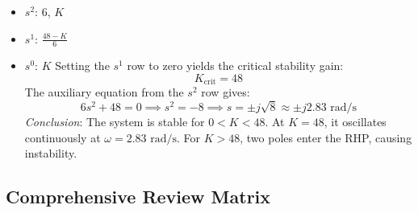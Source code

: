 \documentclass[12pt,onecolumn,twoside ]{article}
\begin{document}
\begin{enumerate}
\begin{itemize}
			$s^3$: $1$, $8$
			\item
			$s^2$: $6$, $K$
			\item
			$s^1$: $\frac{48 - K}{6}$
			\item
			$s^0$: $K$
			Setting the $s^1$ row to zero yields the critical stability gain: \[
			K_{\text{crit}} = 48
			\] The auxiliary equation from the $s^2$ row gives: \[
			6s^2 + 48 = 0 \implies s^2 = -8 \implies s = \pm j\sqrt{8} \approx \pm j 2.83\text{ rad/s}
			\] \textit{Conclusion}: The system is stable for $0 < K < 48$. At $K = 48$, it oscillates continuously at $\omega = 2.83\text{ rad/s}$. For $K > 48$, two poles enter the RHP, causing instability.
		\end{itemize}
	\end{enumerate}
	
	\subsection{Comprehensive Review Matrix}
\end{document}
